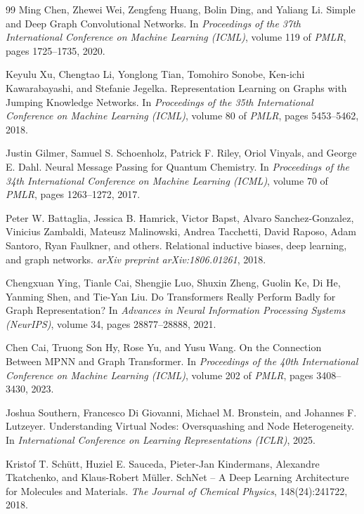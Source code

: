 \documentclass[a4paper,11pt]{article}
\begin{document}
\begin{thebibliography}{99}
Ming Chen, Zhewei Wei, Zengfeng Huang, Bolin Ding, and Yaliang Li.
\newblock Simple and Deep Graph Convolutional Networks.
\newblock In \emph{Proceedings of the 37th International Conference on Machine Learning (ICML)}, volume 119 of \emph{PMLR}, pages 1725--1735, 2020.

Keyulu Xu, Chengtao Li, Yonglong Tian, Tomohiro Sonobe, Ken-ichi Kawarabayashi, and Stefanie Jegelka.
\newblock Representation Learning on Graphs with Jumping Knowledge Networks.
\newblock In \emph{Proceedings of the 35th International Conference on Machine Learning (ICML)}, volume 80 of \emph{PMLR}, pages 5453--5462, 2018.

Justin Gilmer, Samuel S. Schoenholz, Patrick F. Riley, Oriol Vinyals, and George E. Dahl.
\newblock Neural Message Passing for Quantum Chemistry.
\newblock In \emph{Proceedings of the 34th International Conference on Machine Learning (ICML)}, volume 70 of \emph{PMLR}, pages 1263--1272, 2017.

Peter W. Battaglia, Jessica B. Hamrick, Victor Bapst, Alvaro Sanchez-Gonzalez, Vinicius Zambaldi, Mateusz Malinowski, Andrea Tacchetti, David Raposo, Adam Santoro, Ryan Faulkner, and others.
\newblock Relational inductive biases, deep learning, and graph networks.
\newblock \emph{arXiv preprint arXiv:1806.01261}, 2018.

Chengxuan Ying, Tianle Cai, Shengjie Luo, Shuxin Zheng, Guolin Ke, Di He, Yanming Shen, and Tie-Yan Liu.
\newblock Do Transformers Really Perform Badly for Graph Representation?
\newblock In \emph{Advances in Neural Information Processing Systems (NeurIPS)}, volume 34, pages 28877--28888, 2021.

Chen Cai, Truong Son Hy, Rose Yu, and Yusu Wang.
\newblock On the Connection Between MPNN and Graph Transformer.
\newblock In \emph{Proceedings of the 40th International Conference on Machine Learning (ICML)}, volume 202 of \emph{PMLR}, pages 3408--3430, 2023.

Joshua Southern, Francesco Di Giovanni, Michael M. Bronstein, and Johannes F. Lutzeyer.
\newblock Understanding Virtual Nodes: Oversquashing and Node Heterogeneity.
\newblock In \emph{International Conference on Learning Representations (ICLR)}, 2025.

Kristof T. Sch\"utt, Huziel E. Sauceda, Pieter-Jan Kindermans, Alexandre Tkatchenko, and Klaus-Robert M\"uller.
\newblock SchNet -- A Deep Learning Architecture for Molecules and Materials.
\newblock \emph{The Journal of Chemical Physics}, 148(24):241722, 2018.


\end{thebibliography}
\end{document}
